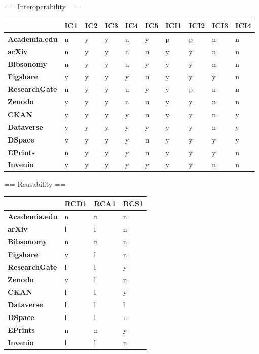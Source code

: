 == Interoperability ==

\begin{tabular}{|m{2.1cm}|m{0.8cm}|m{0.8cm}|m{0.8cm}|m{0.8cm}|m{0.8cm}|m{0.8cm}|m{0.8cm}|m{0.8cm}|m{0.8cm}|} \hline 
 & \textbf{IC1}  & \textbf{IC2}  & \textbf{IC3}  & \textbf{IC4}  & \textbf{IC5}  & \textbf{ICI1}  & \textbf{ICI2}  & \textbf{ICI3}  & \textbf{ICI4}  \\ \hline 
\textbf{Academia.edu}  &n &y &y &n &y &p &p &n &n \\ \hline 
\textbf{arXiv}  &n &y &y &n &n &y &y &n &n \\ \hline 
\textbf{Bibsonomy}  &n &y &y &n &y &y &y &n &n \\ \hline 
\textbf{Figshare}  &y &y &y &y &n &y &y &y &n \\ \hline 
\textbf{ResearchGate}  &n &y &y &n &y &y &p &n &n \\ \hline 
\textbf{Zenodo}  &y &y &y &n &n &y &y &n &n \\ \hline 
 \hline 
\textbf{CKAN}  &y &y &y &y &n &y &y &n &y \\ \hline 
\textbf{Dataverse}  &y &y &y &y &y &y &y &n &y \\ \hline 
\textbf{DSpace}  &y &y &y &y &n &y &y &y &y \\ \hline 
\textbf{EPrints}  &n &y &y &y &n &y &y &y &n \\ \hline 
\textbf{Invenio}  &y &y &y &y &y &y &y &n &n \\ \hline 
 \end{tabular}


== Reusability ==

\begin{tabular}{|m{2.1cm}|m{0.8cm}|m{0.8cm}|m{0.8cm}|} \hline 
 & \textbf{RCD1}  & \textbf{RCA1}  & \textbf{RCS1}  \\ \hline 
\textbf{Academia.edu}  &n &n &n \\ \hline 
\textbf{arXiv}  &l &l &n \\ \hline 
\textbf{Bibsonomy}  &n &n &n \\ \hline 
\textbf{Figshare}  &y &l &n \\ \hline 
\textbf{ResearchGate}  &l &l &y \\ \hline 
\textbf{Zenodo}  &y &l &n \\ \hline 
 \hline 
\textbf{CKAN}  &l &l &y \\ \hline 
\textbf{Dataverse}  &l &l &l \\ \hline 
\textbf{DSpace}  &l &l &n \\ \hline 
\textbf{EPrints}  &n &n &y \\ \hline 
\textbf{Invenio}  &l &l &n \\ \hline 
 \end{tabular}


